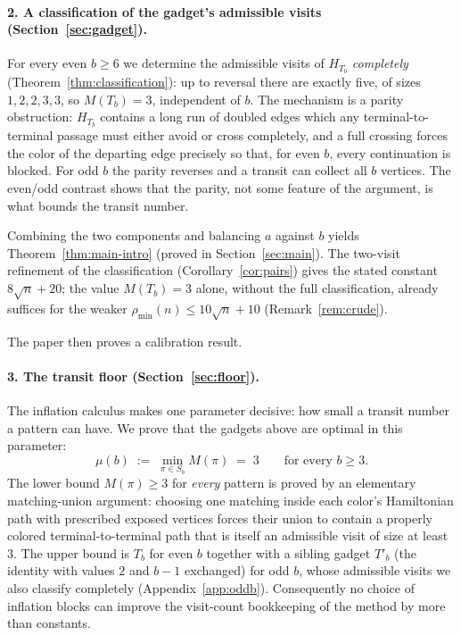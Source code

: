 \documentclass[11pt]{article}
\theoremstyle{definition}
\newcommand{\pmin}{\rho_{\min}}
\begin{document}
\paragraph{2. A classification of the gadget's admissible visits
(Section~\ref{sec:gadget}).}
For every even $b \ge 6$ we determine the admissible visits of $H_{T_b}$
\emph{completely} (Theorem~\ref{thm:classification}): up to reversal there are exactly
five, of sizes $1, 2, 2, 3, 3$, so $M(T_b) = 3$, independent of $b$. The mechanism is a
parity obstruction: $H_{T_b}$ contains a long run of doubled edges which any
terminal-to-terminal passage must either avoid or cross completely, and a full crossing
forces the color of the departing edge precisely so that, for even $b$, every
continuation is blocked. For odd $b$ the parity reverses and a transit can collect all
$b$ vertices. The even/odd
contrast shows that the parity, not some feature of the argument, is what bounds the
transit number.

Combining the two components and balancing $a$ against $b$ yields
Theorem~\ref{thm:main-intro} (proved in Section~\ref{sec:main}). The two-visit
refinement of the classification (Corollary~\ref{cor:pairs}) gives the stated constant
$8\sqrt n + 20$; the value $M(T_b) = 3$ alone, without the full classification, already
suffices for the weaker $\pmin(n) \le 10\sqrt n + 10$ (Remark~\ref{rem:crude}).


The paper then proves a calibration result.

\paragraph{3. The transit floor (Section~\ref{sec:floor}).}
The inflation calculus makes one parameter decisive: how small a transit number a
pattern can have. We prove that the gadgets above are optimal in this parameter:
\[
  \mu(b) \;:=\; \min_{\pi \in S_b} M(\pi) \;=\; 3 \qquad \text{for every } b \ge 3 .
\]
The lower bound $M(\pi) \ge 3$ for \emph{every} pattern is proved by an elementary
matching-union argument: choosing one matching inside each color's Hamiltonian path
with prescribed exposed vertices forces their union to contain a properly colored
terminal-to-terminal path that is itself an admissible visit of size at least $3$. The
upper bound is $T_b$ for even $b$ together with a sibling gadget $T'_b$ (the identity
with values $2$ and $b-1$ exchanged) for odd $b$, whose admissible visits we also
classify completely (Appendix~\ref{app:oddb}). Consequently no choice of inflation
blocks can improve the visit-count bookkeeping of the method by more than constants.
\end{document}
